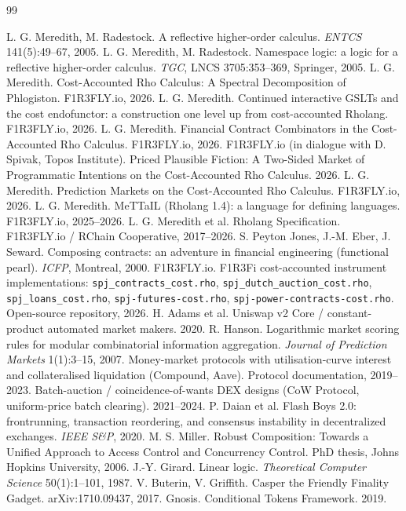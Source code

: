 \documentclass[11pt]{article}
\theoremstyle{definition}
\begin{document}
\begin{thebibliography}{99}

 L. G. Meredith, M. Radestock. A reflective higher-order calculus. \emph{ENTCS}
141(5):49--67, 2005.
 L. G. Meredith, M. Radestock. Namespace logic: a logic for a reflective higher-order
calculus. \emph{TGC}, LNCS 3705:353--369, Springer, 2005.
 L. G. Meredith. Cost-Accounted Rho Calculus: A Spectral Decomposition of Phlogiston.
F1R3FLY.io, 2026.
 L. G. Meredith. Continued interactive GSLTs and the cost endofunctor: a construction
one level up from cost-accounted Rholang. F1R3FLY.io, 2026.
 L. G. Meredith. Financial Contract Combinators in the Cost-Accounted Rho Calculus.
F1R3FLY.io, 2026.
 F1R3FLY.io (in dialogue with D. Spivak, Topos Institute). Priced Plausible Fiction: A
Two-Sided Market of Programmatic Intentions on the Cost-Accounted Rho Calculus. 2026.
 L. G. Meredith. Prediction Markets on the Cost-Accounted Rho Calculus. F1R3FLY.io,
2026.
 L. G. Meredith. MeTTaIL (Rholang 1.4): a language for defining languages. F1R3FLY.io,
2025--2026.
 L. G. Meredith et al. Rholang Specification. F1R3FLY.io / RChain Cooperative,
2017--2026.
 S. Peyton Jones, J.-M. Eber, J. Seward. Composing contracts: an adventure in financial
engineering (functional pearl). \emph{ICFP}, Montreal, 2000.
 F1R3FLY.io. F1R3Fi cost-accounted instrument implementations:
\texttt{spj\_contracts\_cost.rho}, \texttt{spj\_dutch\_auction\_cost.rho},
\texttt{spj\_loans\_cost.rho}, \texttt{spj-futures-cost.rho}, \texttt{spj-power-contracts-cost.rho}.
Open-source repository, 2026.
 H. Adams et al. Uniswap v2 Core / constant-product automated market makers. 2020.
 R. Hanson. Logarithmic market scoring rules for modular combinatorial information
aggregation. \emph{Journal of Prediction Markets} 1(1):3--15, 2007.
 Money-market protocols with utilisation-curve interest and collateralised liquidation
(Compound, Aave). Protocol documentation, 2019--2023.
 Batch-auction / coincidence-of-wants DEX designs (CoW Protocol, uniform-price batch
clearing). 2021--2024.
 P. Daian et al. Flash Boys 2.0: frontrunning, transaction reordering, and consensus
instability in decentralized exchanges. \emph{IEEE S\&P}, 2020.
 M. S. Miller. Robust Composition: Towards a Unified Approach to Access Control and
Concurrency Control. PhD thesis, Johns Hopkins University, 2006.
 J.-Y. Girard. Linear logic. \emph{Theoretical Computer Science} 50(1):1--101, 1987.
 V. Buterin, V. Griffith. Casper the Friendly Finality Gadget. arXiv:1710.09437, 2017.
 Gnosis. Conditional Tokens Framework. 2019.

\end{thebibliography}
\end{document}
